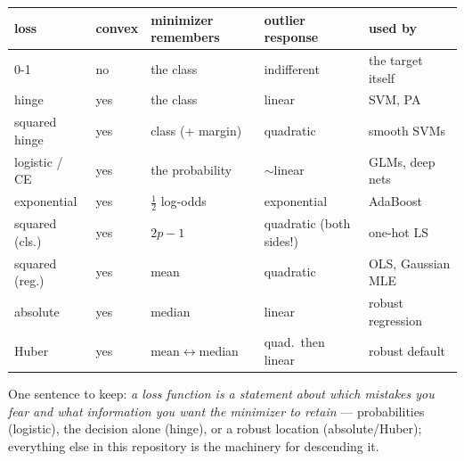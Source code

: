 \documentclass[11pt]{article}
\begin{document}
\begin{center}
\begin{tabular}{lllll}
\toprule
loss & convex & minimizer remembers & outlier response & used by\\
\midrule
0-1 & no & the class & indifferent & the target itself\\
hinge & yes & the class & linear & SVM, PA\\
squared hinge & yes & class (+ margin) & quadratic & smooth SVMs\\
logistic / CE & yes & the probability & $\sim$linear & GLMs, deep nets\\
exponential & yes & $\tfrac12$ log-odds & exponential & AdaBoost\\
squared (cls.) & yes & $2p-1$ & quadratic (both sides!) & one-hot LS\\
\midrule
squared (reg.) & yes & mean & quadratic & OLS, Gaussian MLE\\
absolute & yes & median & linear & robust regression\\
Huber & yes & mean$\leftrightarrow$median & quad.\ then linear & robust default\\
\bottomrule
\end{tabular}
\end{center}

\noindent
One sentence to keep: \emph{a loss function is a statement about which
mistakes you fear and what information you want the minimizer to
retain} --- probabilities (logistic), the decision alone (hinge), or a
robust location (absolute/Huber); everything else in this repository is
the machinery for descending it.
\end{document}
